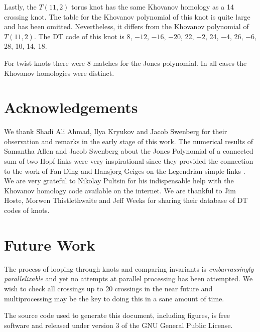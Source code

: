 \documentclass{article}
\theoremstyle{plain}
\begin{document}
        Lastly, the $T(11,2)$ torus knot has the same Khovanov homology as a
        14 crossing knot. The table for the Khovanov polynomial of this knot
        is quite large and has been omitted. Nevertheless, it differs from the
        Khovanov polynomial of $T(11,2)$. The DT code of this knot is
        8, $-12$, $-16$, $-20$, 22, $-2$, 24, $-4$, 26, $-6$, 28, 10, 14, 18.
        \par\hfill\par
        For twist knots there were 8 matches for the Jones polynomial. In all
        cases the Khovanov homologies were distinct.
    \section{Acknowledgements}
        We thank Shadi Ali Ahmad, Ilya Kryukov and Jacob Swenberg for their
        observation and remarks in the early stage of this work. The numerical
        results of Samantha Allen and Jacob Swenberg about the Jones Polynomial
        of a connected sum of two Hopf links were very inspirational since they
        provided the connection to the work of Fan Ding and Hansjorg Geiges on
        the Legendrian simple links . We are very grateful to Nikolay Pultsin
        for his indispensable help with the Khovanov homology code available
        on the internet. We are thankful to Jim Hoste, Morwen Thistlethwaite
        and Jeff Weeks for sharing their database of DT codes of knots.
    \section{Future Work}
        The process of looping through knots and comparing invariants is
        \textit{embarrassingly parallelizable} and yet no attempts at
        parallel processing has been attempted. We wish to check all crossings
        up to 20 crossings in the near future and multiprocessing may be the
        key to doing this in a sane amount of time.
    \newpage
    
    
    \newpage
    The source code used to generate this document, including figures,
    is free software and released under version 3 of the GNU General Public
    License.
\end{document}
